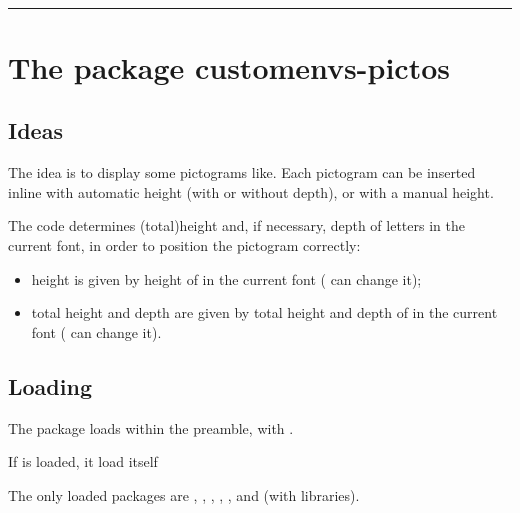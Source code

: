 \documentclass[english,10pt,a4paper]{article}
\begin{document}
\vfill~

\pagebreak


\hypertarget{matoc}{}

\tableofcontents

\vspace*{5mm}

\hrule

\vspace*{5mm}

\section{The package customenvs-pictos}

\subsection{Ideas}

The idea is to display some pictograms like. Each pictogram can be inserted inline with automatic height (with or without depth), or with a manual height.

\smallskip

The code determines (total)height and, if necessary, depth of letters in the current font, in order
to position the pictogram correctly:

\begin{itemize}
	\item height is given by height of \texttt{\footnotesize\setlength\fboxsep{0.1pt}} in the current font ( can change it);
	\item total height and depth are given by total height and depth of \texttt{\footnotesize\setlength\fboxsep{0.1pt}} in the current font ( can change it).
\end{itemize}

\subsection{Loading}

The package loads within the preamble, with .

If  is loaded, it load itself 

The only loaded packages are , , , , ,  and  (with  libraries).
\end{document}
